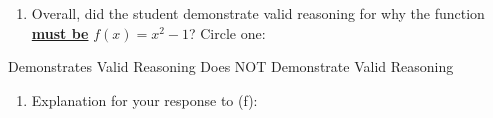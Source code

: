 \documentclass[10pt]{article}
\begin{document}
\begin{enumerate}
\begin{enumerate}[resume]
	\vspace*{-8pt}
	\item Overall, did the student demonstrate valid reasoning for why the function \underline{\bf must be} $f(x)=x^2-1$? Circle one: 
	\end{enumerate}
	
		\vspace*{-12pt}
		\begin{mdframed}
		\begin{center}
		Demonstrates Valid Reasoning \quad\quad \quad Does NOT Demonstrate Valid Reasoning
		\end{center}
		\end{mdframed}
		
	\vspace*{-12pt}
	\begin{enumerate}[resume]
	\item Explanation for your response to (f):
	\end{enumerate}
	
	\vspace*{-8pt}
		\begin{mdframed} \vspace*{1.75in} \end{mdframed}	

 \end{enumerate} 
\newpage
\end{document}
